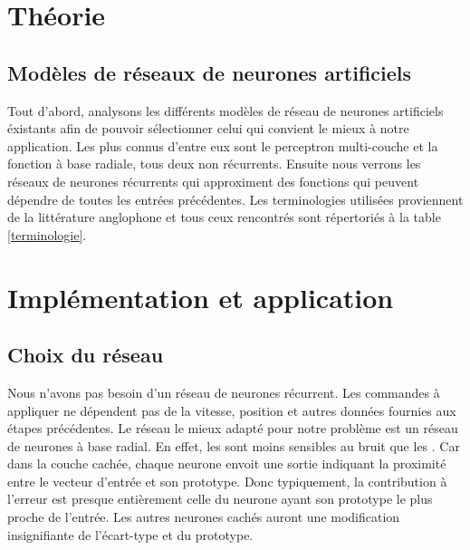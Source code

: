 \documentclass[12pt,a4paper,oneside, titlepage]{article}
\begin{document}


\tableofcontents
\newpage


\newpage
\section{Théorie}
\subsection{Modèles de réseaux de neurones artificiels}
\terminologie
Tout d'abord, analysons les différents modèles de réseau de neurones artificiels éxistants afin de pouvoir sélectionner celui qui convient le mieux à notre application.
Les plus connus d'entre eux sont le perceptron multi-couche et la fonction à base radiale, tous deux non récurrents.
Ensuite nous verrons les réseaux de neurones récurrents qui approximent des fonctions qui peuvent dépendre de toutes les entrées précédentes.
Les terminologies utilisées proviennent de la littérature anglophone et tous ceux rencontrés sont répertoriés à la table \ref{terminologie}.
\newcommand{\ssstitle}[1]{\begin{center}\large\underline{#1}\normalsize\end{center}}


%

%





\newpage
\section{Implémentation et application}



\subsection{Choix du réseau}
Nous n'avons pas besoin d'un réseau de neurones récurrent.
Les commandes à appliquer ne dépendent pas de la vitesse, position et autres données fournies aux étapes précédentes.
Le réseau le mieux adapté pour notre problème est un réseau de neurones à base radial.
En effet, les \rbf sont moins sensibles au bruit que les \mlp \cite{adversarial,Gauthier}.%
Car dans la couche cachée, chaque neurone envoit une sortie indiquant la proximité entre le vecteur d'entrée et son prototype.
Donc typiquement, la contribution à l'erreur est presque entièrement celle du neurone ayant son prototype le plus proche de l'entrée.
Les autres neurones cachés auront une modification insignifiante de l'écart-type et du prototype.\\
\end{document}
